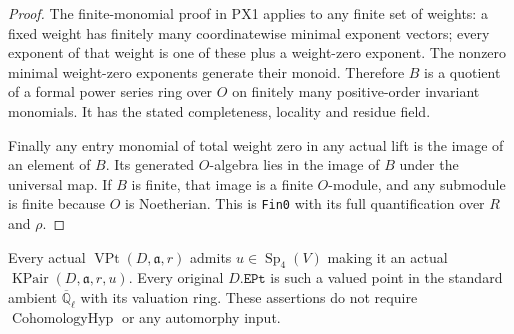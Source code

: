 \begin{proof}
The finite-monomial proof in PX1 applies to any finite set of
weights: a fixed weight has finitely many coordinatewise
minimal exponent vectors; every exponent of that weight is
one of these plus a weight-zero exponent.  The nonzero minimal
weight-zero exponents generate their monoid.  Therefore $B$
is a quotient of a formal power series ring over $O$ on
finitely many positive-order invariant monomials.  It has the
stated completeness, locality and residue field.

Finally any entry monomial of total weight zero in any actual
lift is the image of an element of $B$.  Its generated
$O$-algebra lies in the image of $B$ under the universal map.
If $B$ is finite, that image is a finite $O$-module, and any
submodule is finite because $O$ is Noetherian.  This is
\texttt{Fin0} with its full quantification over $R$ and $\rho$.
\end{proof}

\begin{proposition}
\label{claim:IX2}
Every actual $\operatorname{VPt}(D,\mathfrak a,r)$ admits
$u\in\operatorname{Sp}_4(V)$ making it an actual
$\operatorname{KPair}(D,\mathfrak a,r,u)$.
Every original $D.\texttt{EPt}$ is such a valued point in the
standard ambient $\overline{\mathbb Q}_\ell$ with its valuation
ring.  These assertions do not require
$\operatorname{CohomologyHyp}$ or any automorphy input.
\end{proposition}

